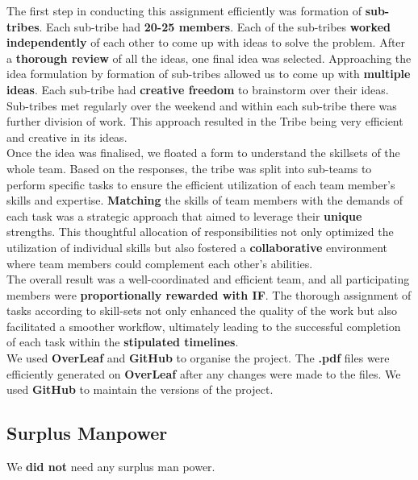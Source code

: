 The first step in conducting this assignment efficiently was formation of \textbf{sub-tribes}. Each sub-tribe had \textbf{20-25 members}. Each of the sub-tribes \textbf{worked independently} of each other to come up with ideas to solve the problem. After a \textbf{thorough review} of all the ideas, one final idea was selected. Approaching the idea formulation by formation of sub-tribes allowed us to come up with \textbf{multiple ideas}. Each sub-tribe had \textbf{creative freedom} to brainstorm over their ideas. Sub-tribes met regularly over the weekend and within each sub-tribe there was further division of work. This approach resulted in the Tribe being very efficient and creative in its ideas.
\\

Once the idea was finalised, we floated a form to understand the skillsets of the whole team. Based on the responses, the tribe was split into sub-teams to perform specific tasks to ensure the efficient utilization of each team member's skills and expertise. \textbf{Matching} the skills of team members with the demands of each task was a strategic approach that aimed to leverage their \textbf{unique} strengths. This thoughtful allocation of responsibilities not only optimized the utilization of individual skills but also fostered a \textbf{collaborative} environment where team members could complement each other's abilities.
\\

The overall result was a well-coordinated and efficient team, and all participating members were \textbf{proportionally rewarded with IF}. The thorough assignment of tasks according to skill-sets not only enhanced the quality of the work but also facilitated a smoother workflow, ultimately leading to the successful completion of each task within the \textbf{stipulated timelines}.
\\

We used \textbf{OverLeaf} and \textbf{GitHub} to organise the project. The \textbf{.pdf} files were efficiently generated on \textbf{OverLeaf} after any changes were made to the files. We used \textbf{GitHub} to maintain the versions of the project. 


\subsection{Surplus Manpower}
We \textbf{did not} need any surplus man power.
